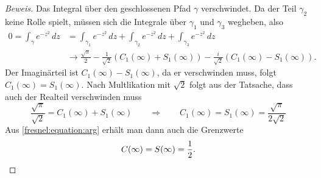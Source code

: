 \begin{proof}[Beweis]
Das Integral über den geschlossenen Pfad $\gamma$ verschwindet.
Da der Teil $\gamma_2$ keine Rolle spielt, müssen sich die
Integrale über $\gamma_1$ und $\gamma_3$ wegheben, also
\begin{align*}
0
=
\int_\gamma e^{-z^2}\,dz
&=
\int_{\gamma_1} e^{-z^2}\,dz
+
\int_{\gamma_2} e^{-z^2}\,dz
+
\int_{\gamma_3} e^{-z^2}\,dz
\\
&\to
\frac{\sqrt{\pi}}2
-\frac{1}{\sqrt{2}}(C_1(\infty)+S_1(\infty))
-\frac{i}{\sqrt{2}}(C_1(\infty)-S_1(\infty)).
\end{align*}
Der Imaginärteil ist $C_1(\infty)-S_1(\infty)$, da er verschwinden
muss, folgt $C_1(\infty)=S_1(\infty)$.
Nach Multlikation mit $\sqrt{2}$ folgt aus der Tatsache, dass auch
der Realteil verschwinden muss
\[
\frac{\sqrt{\pi}}{\sqrt{2}} = C_1(\infty)+S_1(\infty)
\qquad
\Rightarrow
\qquad
C_1(\infty)
=
S_1(\infty)
=
\frac{\sqrt{\pi}}{2\sqrt{2}}
\]
Aus
\eqref{fresnel:equation:arg}
erhält man dann auch die Grenzwerte
\[
C(\infty)=S(\infty)=\frac12.
\qedhere
\]
\end{proof}
